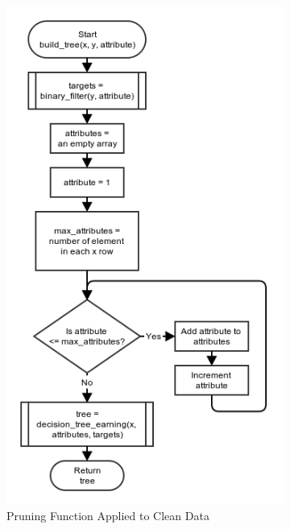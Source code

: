 \documentclass[11pt,a4paper]{article}
\begin{document}
\begin{figure}[!ht]
	\centering
	\begin{subfigure}[b]{0.495\textwidth}
		\includegraphics[width=\textwidth]{images/flow_chart/build_tree.png}
     	\caption{Pruning Function Applied to Clean Data}
     	\label{fig:pruningClean}
    \end{subfigure}
	\begin{subfigure}[b]{0.495\textwidth}

\end{subfigure}
\end{figure}
\end{document}
